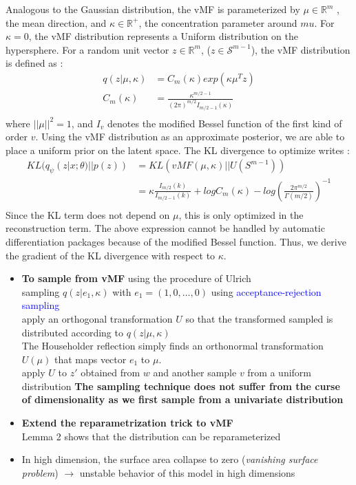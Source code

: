 \documentclass[12pt]{article}
\newcommand{\RR}{\mathbb{R}} %
\newcommand{\blue}[1]{\textcolor{blue}{#1}}
\begin{document}
Analogous to the Gaussian distribution, the vMF is parameterized by $\mu\in\RR^m$ , the mean direction, and $\kappa\in\RR^+$, the concentration parameter around $mu$. For $\kappa=0$, the vMF distribution represents a Uniform distribution on the hypersphere.
For a random unit vector $z\in\RR^m$, ($z\in\mathcal{S}^{m-1}$), the vMF distribution is defined as :
\begin{align*}
    q(z|\mu, \kappa) &= C_m(\kappa) exp(\kappa \mu^T z) \\
    C_m(\kappa) &= \frac{\kappa^{m/2-1}}{(2\pi)^{m/2}I_{m/2-1}(\kappa)} \\
\end{align*}
where $||\mu||^2 =1$, and $I_v$ denotes the modified Bessel function of the first kind of order $v$.
Using the vMF distribution as an approximate posterior, we are able to place a uniform prior on the latent space.
The KL divergence to optimize writes :
\begin{align*}
    KL(q_\psi(z|x; \theta) ||p(z)) &= KL(vMF(\mu, \kappa) || U(S^{m-1})) \\
    &= \kappa\frac{I_{m/2}(k)}{I_{m/2-1}(k)} + log C_m(\kappa) - log\left(\frac{2\pi^{m/2}}{\Gamma(m/2)}\right)^{-1}\\
\end{align*}
Since the KL term does not depend on $\mu$, this is only optimized in the reconstruction term. 
The above expression cannot be handled by automatic differentiation packages because of the modified Bessel function. Thus, we derive the gradient of the KL divergence with respect to $\kappa$. \\ 
\begin{itemize}
    \item \textbf{To sample from vMF} using the procedure of Ulrich \\
        sampling $q(z|e_1, \kappa)$  with $e_1 = (1, 0, \dots, 0)$ using \blue{acceptance-rejection sampling} \\ 
        apply an orthogonal transformation $U$ so that the transformed sampled is distributed according to $q(z|\mu, \kappa)$ \\
        The Householder reflection simply finds an orthonormal transformation $U(\mu)$ that maps vector $e_1$ to $\mu$. \\
        apply $U$ to $z'$ obtained from $w$ and another sample $v$ from a uniform distribution
        \textbf{The sampling technique does not suffer from the curse of dimensionality as we first sample from a univariate distribution}
        
    \item \textbf{Extend the reparametrization trick to vMF}\\ 
    Lemma 2 shows that the distribution can be reparameterized
    \item In high dimension, the surface area collapse to zero (\textit{vanishing surface problem}) $\rightarrow$ unstable behavior of this model in high dimensions
\end{itemize}
 
\end{document}
